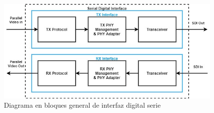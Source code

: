 \vspace{1cm}
\begin{figure}[htbp]
    \centering
    \includegraphics[width=\linewidth]{./Figures/sdi.jpg}
    \caption{Diagrama en bloques general de interfaz digital serie}\label{fig:sdi}
\end{figure}
\vspace{1cm}

\documentclass{article}
\usepackage[utf8]{inputenc}
\usepackage{enumitem}

\section{Estándares soportados por la interfaz}

El módulo soporta SMPTE SD/HD/3G-SDI implementa tres estándares de la interfaz:

\begin{itemize}[label=--]
    \item SD-SDI (SMPTE ST 259): Señal digital de televisión estándar.
    \item HD-SDI (SMPTE ST 292): Interfaz serie de señal de 1.5 Gb/s.
    \item 3G-SDI (SMPTE ST 424): Interfaz serie de señal de 3 Gb/s.
\end{itemize}

\subsection{Definición estándar}

El módulo está diseñado para soportar la tasa de bits de 270 Mb/s y es compatible
con el estándar de detección y manejo de errores o EDH (del inglés, Error
Detection and Handling) SMPTE RP 165 para las secciones de recepción y transmisión.

\subsection{Alta definición}


